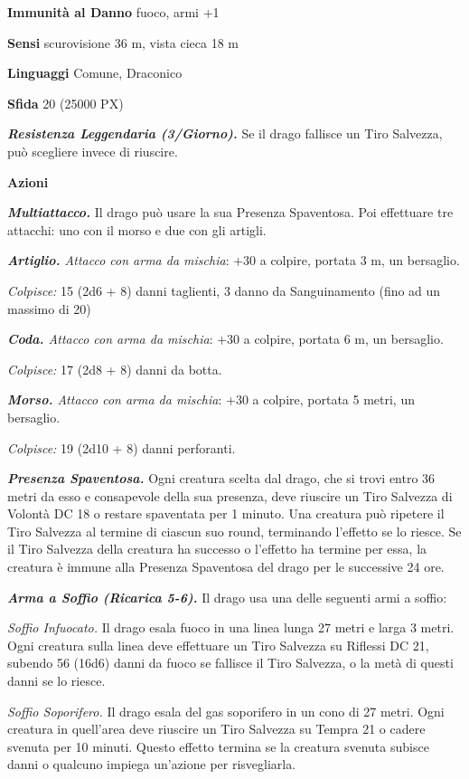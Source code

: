 \begin{multicols}{2}
	\textbf{Immunità al Danno} fuoco, armi +1

	\textbf{Sensi} scurovisione 36 m, vista cieca 18 m

	\textbf{Linguaggi} Comune, Draconico

	\textbf{Sfida} 20 (25000 PX)

	\textit{\textbf{Resistenza Leggendaria (3/Giorno).}} Se il drago fallisce un Tiro Salvezza, può scegliere invece di riuscire.

	\textbf{Azioni}

	\textit{\textbf{Multiattacco.}} Il drago può usare la sua Presenza Spaventosa. Poi effettuare tre attacchi: uno con il morso e due con gli artigli.

	\textit{\textbf{Artiglio.} Attacco con arma da mischia}: +30 a colpire, portata 3 m, un bersaglio.

	\textit{Colpisce:} 15 (2d6 + 8) danni taglienti, 3 danno da Sanguinamento (fino ad un massimo di 20)

	\textit{\textbf{Coda.} Attacco con arma da mischia}: +30 a colpire, portata 6 m, un bersaglio.

	\textit{Colpisce:} 17 (2d8 + 8) danni da botta.

	\textit{\textbf{Morso.} Attacco con arma da mischia}: +30 a colpire, portata 5 metri, un bersaglio.

	\textit{Colpisce:} 19 (2d10 + 8) danni perforanti.

	\textit{\textbf{Presenza Spaventosa.}} Ogni creatura scelta dal drago, che si trovi entro 36 metri da esso e consapevole della sua presenza, deve riuscire un Tiro Salvezza di Volontà DC 18 o restare spaventata per 1 minuto. Una creatura può ripetere il Tiro Salvezza al termine di ciascun suo round, terminando l'effetto se lo riesce. Se il Tiro Salvezza della creatura ha successo o l'effetto ha termine per essa, la creatura è immune alla Presenza Spaventosa del drago per le successive 24 ore.

	\textit{\textbf{Arma a Soffio (Ricarica 5-6).}} Il drago usa una delle seguenti armi a soffio:

	\textit{Soffio Infuocato.} Il drago esala fuoco in una linea lunga 27 metri e larga 3 metri. Ogni creatura sulla linea deve effettuare un Tiro Salvezza su Riflessi DC 21, subendo 56 (16d6) danni da fuoco se fallisce il Tiro Salvezza, o la metà di questi danni se lo riesce.

	\textit{Soffio Soporifero.} Il drago esala del gas soporifero in un cono di 27 metri. Ogni creatura in quell'area deve riuscire un Tiro Salvezza su Tempra 21 o cadere svenuta per 10 minuti. Questo effetto
	termina se la creatura svenuta subisce danni o qualcuno impiega un'azione per risvegliarla.


\end{multicols}
